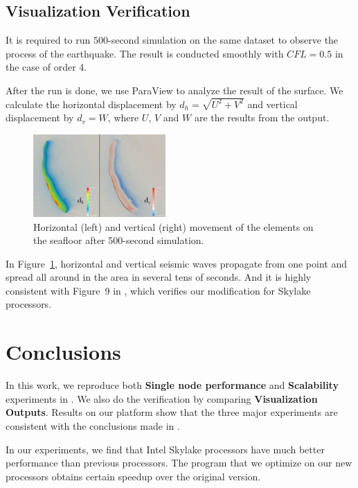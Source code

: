 \documentclass[5p,times]{sig-alternate-05-2015}
\begin{document}
\subsection{Visualization Verification}
It is required to run $500$-second simulation on the same dataset to observe the process of the earthquake. The result is conducted smoothly with $CFL=0.5$ in the case of order 4.

After the run is done, we use ParaView to analyze the result of the surface. We calculate the horizontal displacement by $d_h=\sqrt{U^2+V^2}$ and vertical displacement by $d_v=W$, where $U$, $V$ and $W$ are the results from the output.

\begin{figure}[!ht]
	\centering
	\includegraphics[width=0.45\textwidth]{geo.png}
	\caption{Horizontal (left) and vertical (right) movement of the elements on the seafloor after 500-second simulation.}
	\label{fig:geo}
\end{figure}

In Figure~\ref{fig:geo}, horizontal and vertical seismic waves propagate from one point and spread all around in the area in several tens of seconds. And it is highly consistent with Figure~9 in \OriginalPaper, which verifies our modification for Skylake processors.

\section{Conclusions}

In this work, we reproduce both \textbf{Single node performance} and \textbf{Scalability} experiments in \OriginalPaper. We also do the verification by comparing \textbf{Visualization Outputs}. Results on our platform show that the three major experiments are consistent with the conclusions made in \OriginalPaper. 

In our experiments, we find that Intel Skylake processors have much better performance than previous processors. The program that we optimize on our new processors obtains certain speedup over the original version.
\end{document}
